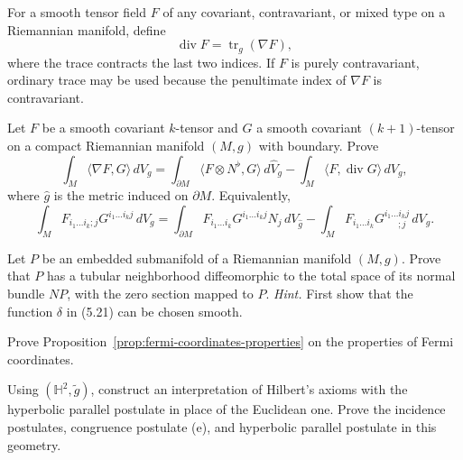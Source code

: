 \begin{exercise}
\label{prob:divergence-tensor-fields}

For a smooth tensor field $F$ of any covariant, contravariant, or mixed type on
a Riemannian manifold, define
\[
\operatorname{div}F=\operatorname{tr}_g(\nabla F),
\]
where the trace contracts the last two indices. If $F$ is purely
contravariant, ordinary trace may be used because the penultimate index of
$\nabla F$ is contravariant.

Let $F$ be a smooth covariant $k$-tensor and $G$ a smooth covariant
$(k+1)$-tensor on a compact Riemannian manifold $(M,g)$ with boundary. Prove
\[
\int_M\langle\nabla F,G\rangle\,dV_g
=\int_{\partial M}\langle F\otimes N^\flat,G\rangle\,d\widehat V_g
-\int_M\langle F,\operatorname{div}G\rangle\,dV_g,
\]
where $\widehat g$ is the metric induced on $\partial M$. Equivalently,
\[
\int_M F_{i_1\ldots i_k;j}G^{i_1\ldots i_kj}\,dV_g
=\int_{\partial M}F_{i_1\ldots i_k}G^{i_1\ldots i_kj}N_j\,dV_{\widehat g}
-\int_MF_{i_1\ldots i_k}G^{i_1\ldots i_kj}_{\ \ \ \ \ \ \ ;j}\,dV_g.
\]
\end{exercise}

\begin{exercise}
\label{prob:tubular-neighborhood-normal-bundle}

Let $P$ be an embedded submanifold of a Riemannian manifold $(M,g)$. Prove
that $P$ has a tubular neighborhood diffeomorphic to the total space of its
normal bundle $NP$, with the zero section mapped to $P$.
\emph{Hint.} First show that the function $\delta$ in (5.21) can be chosen
smooth.
\end{exercise}

\begin{exercise}
\label{prob:fermi-coordinates}

Prove Proposition~\ref{prop:fermi-coordinates-properties} on the properties of
Fermi coordinates.
\end{exercise}

\begin{exercise}
\label{prob:hyperbolic-geometry-hilbert-axioms}

Using $(\mathbb H^2,\widetilde g)$, construct an interpretation of Hilbert's
axioms with the hyperbolic parallel postulate in place of the Euclidean one.
Prove the incidence postulates, congruence postulate (e), and hyperbolic
parallel postulate in this geometry.
\end{exercise}

